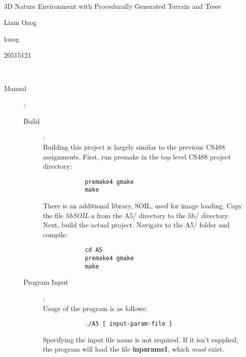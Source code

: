 \documentclass{article}
\newcommand\projecttitle{3D Nature Environment with Procedurally Generated Terrain and Trees}
\newcommand\myname{Liam Ozog}
\newcommand\myuserid{lozog}
\newcommand\mystudentid{20515121}
\begin{document}
~\vfill
\begin{center}
\Large

\projecttitle

\myname

\myuserid

\mystudentid

\end{center}
\vfill ~\vfill~
\newpage
{}
\begin{description}
\item[Manual]:
	\begin{description}
	\item[Build]:\\
		Building this project is largely similar to the previous CS488 assignments. First, run premake in the top level CS488 project directory:
		\begin{verbatim}
			premake4 gmake
			make
		\end{verbatim}
		There is an additional library, SOIL, used for image loading. Copy the file \textit{libSOIL.a} from the A5/ directory to the lib/ directory. \\
		Next, build the actual project. Navigate to the A5/ folder and compile:
		\begin{verbatim}
			cd A5
			premake4 gmake
			make
		\end{verbatim}

	\item[Program Input]:\\
		Usage of the program is as follows:
		\begin{verbatim}
			./A5 [ input-param-file ]
		\end{verbatim}
		Specifying the input file name is not required. If it isn't supplied, the program will load the file \textbf{inparams1}, which \textit{must} exist.


\end{description}
\end{description}
\end{document}
